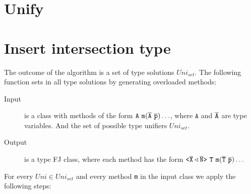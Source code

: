 \documentclass[a4paper,USenglish,cleveref, autoref, thm-restate]{lipics-v2021}
\begin{document}
\section{Unify}
\label{sec:unify-1}




\section{Insert intersection type}
\label{sec:insert-inters-type}

The outcome of the \unify algorithm is a set of type solutions $Uni_{set}$.
The following function sets in all type solutions by generating overloaded methods:

\begin{description}
\item[Input] is a class with methods of the form%
$\mathtt{A\ m(\overline{\tt A}\ \overline{\tt p})\ldots}$, where $\mathtt{A}$ and $\mathtt{\overline{\tt A}}$ are type variables.
And the set of possible type unifiers $Uni_{set}$.
\item[Output] is a type FJ class, where each method has the form
$\mathtt{\exptype{}{\ol{X} \triangleleft \ol{N}}\ T\ m(\ol{T}\ \ol{p})\ldots}$
\end{description}


For every $Uni \in Uni_{set}$ and every method \texttt{m} in the input class we apply the following steps:
\end{document}
